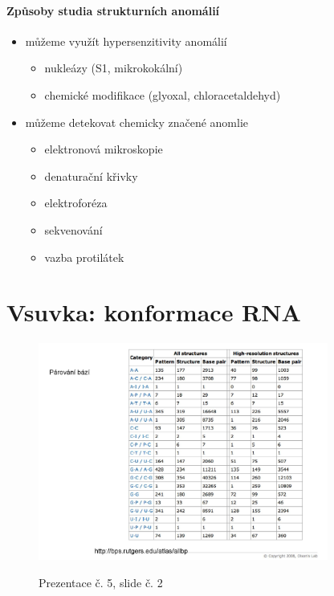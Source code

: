 \documentclass[DIV=8]{scrreprt}
\begin{document}
\paragraph{Způsoby studia strukturních anomálií}
\begin{itemize}[nosep]
    \item můžeme využít hypersenzitivity anomálií
\begin{itemize}[nosep]
    \item nukleázy (S1, mikrokokální)
    \item chemické modifikace (glyoxal, chloracetaldehyd)
\end{itemize}

    \item můžeme detekovat chemicky značené anomlie
\begin{itemize}[nosep]
    \item  elektronová mikroskopie
    \item denaturační křivky
    \item elektroforéza
    \item sekvenování
    \item vazba protilátek
\end{itemize}

\end{itemize}



\section{Vsuvka: konformace RNA} \label{Vsuvka: konformace RNA}


\begin{figure}
    \caption{Prezentace č. 5, slide č. 2}
    \includegraphics[width=0.85\textwidth]{slides-5/slide-2.jpg}
    \centering
    \label{slides-5-slide-2}
\end{figure}
\end{document}
